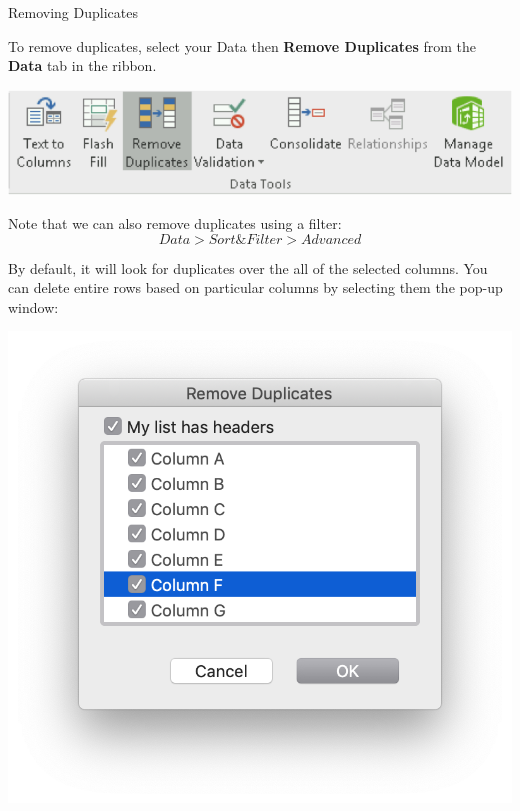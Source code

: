 \documentclass[xcolor=svgnames]{beamer}
\begin{document}
\begin{frame}[fragile]{Removing Duplicates}


To remove duplicates, select your Data then {\bf Remove Duplicates} from the {\bf Data} tab in the ribbon.
\begin{center}
 \includegraphics[width=.7\textwidth]{RmDup}
\end{center}

Note that we can also remove duplicates using a filter:
$$Data > Sort \& Filter > Advanced$$

\begin{minipage}{0.6\textwidth}\raggedleft
By default, it will look for duplicates over the all of the selected columns.  You can delete entire rows based on particular columns by selecting them the pop-up window:
\end{minipage}
\hfill
\noindent\begin{minipage}{0.3\textwidth}%
\includegraphics[width=\linewidth]{removedup}
\end{minipage}%

\end{frame}
\end{document}
